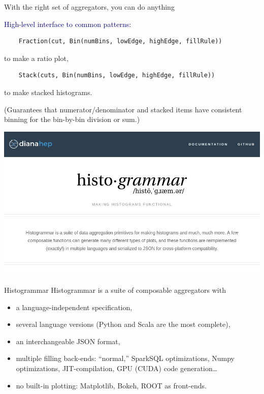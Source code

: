 \documentclass[aspectratio=169]{beamer}
\begin{document}
\begin{frame}[fragile]{With the right set of aggregators, you can do anything}
\begin{center}
\begin{minipage}{0.9\linewidth}
\small
\textcolor{darkblue}{\normalsize High-level interface to common patterns:}
\begin{verbatim}
    Fraction(cut, Bin(numBins, lowEdge, highEdge, fillRule))
\end{verbatim}

{\normalsize to make a ratio plot,}

\begin{verbatim}
    Stack(cuts, Bin(numBins, lowEdge, highEdge, fillRule))
\end{verbatim}

{\normalsize to make stacked histograms.}

\vspace{0.75 cm}
{\normalsize (Guarantees that numerator/denominator and stacked items have consistent binning for the bin-by-bin division or sum.)}
\end{minipage}
\end{center}
\end{frame}

\begin{frame}{}
\hspace{-1 cm}\mbox{\includegraphics[width=16 cm]{frontpage.png}\hspace{-5 cm}}
\end{frame}

\begin{frame}{Histogrammar}
\large Histogrammar is a suite of composable aggregators with

\vspace{0.3 cm}
\begin{itemize}\setlength{\itemsep}{0.3 cm}
\item<2-> a language-independent specification,
\item<3-> several language versions (Python and Scala are the most complete),
\item<4-> an interchangeable JSON format,
\item<5-> multiple filling back-ends: ``normal,'' SparkSQL optimizations, Numpy optimizations, JIT-compilation, GPU (CUDA) code generation\ldots
\item<6-> no built-in plotting: Matplotlib, Bokeh, ROOT as front-ends.
\end{itemize}
\end{frame}
\end{document}
